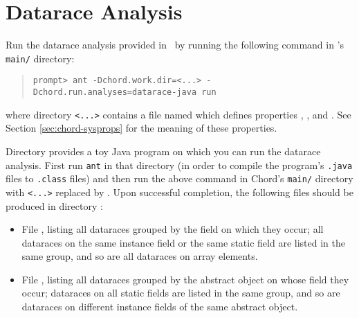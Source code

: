 \section{Datarace Analysis}
\label{sec:datarace}

Run the datarace analysis provided in \Chord\ by running the following command in \Chord's {\tt main/} directory:

\begin{quote}
\begin{verbatim}
prompt> ant -Dchord.work.dir=<...> -Dchord.run.analyses=datarace-java run
\end{verbatim}
\end{quote}

\noindent where directory {\tt <...>} contains a file named  which
defines properties , , and .
See Section \ref{sec:chord-sysprops} for the meaning of these properties.

Directory  provides a toy Java program on which you can run the datarace
analysis.
First run {\tt ant} in that directory (in order to compile the program's {\tt .java} files to
{\tt .class} files) and then run the above command in Chord's {\tt main/} directory
with {\tt <...>} replaced by .
Upon successful completion, the following files should be produced in directory
:

\begin{itemize}
\item
File , listing all dataraces grouped by the field on which they occur; all
dataraces on the same instance field or the same static field are listed in the same group, and so are
all dataraces on array elements.
\item
File , listing all dataraces grouped by the abstract object on whose field they occur;
dataraces on all static fields are listed in the same group, and so are dataraces on different
instance fields of the same abstract object.
\end{itemize}


